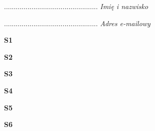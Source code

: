 \begin{turn}{90}\begin{minipage}{\linewidth} \vspace{20mm} ................................................  \textit{Imię i nazwisko}\end{minipage}\end{turn}

\begin{turn}{90}\begin{minipage}{\linewidth} \vspace{20mm} ................................................  \textit{Adres e-mailowy}\end{minipage}\end{turn}

\begin{turn}{90}\huge \textbf{S1}\end{turn}

\begin{turn}{90}\huge \textbf{S2}\end{turn}

\begin{turn}{90}\huge \textbf{S3}\end{turn}

\begin{turn}{90}\huge \textbf{S4}\end{turn}

\begin{turn}{90}\huge \textbf{S5}\end{turn}

\begin{turn}{90}\huge \textbf{S6}\end{turn}
